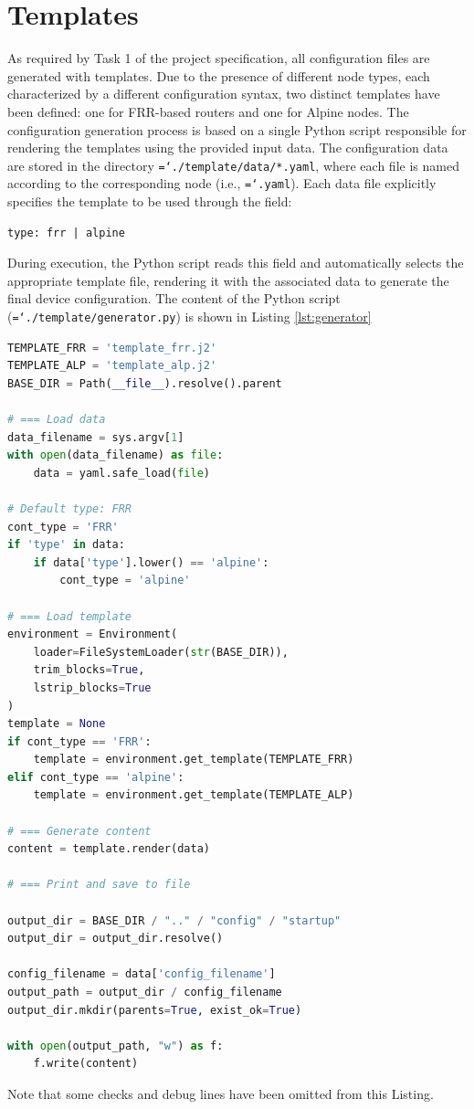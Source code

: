 \documentclass{report}
\newcommand{\monospaced}[1]{\texttt{\hyphenchar\font=`\-#1}}
\begin{document}
\section{Templates}
As required by Task 1 of the project specification, all configuration files are generated with templates. Due to the presence of different node types, each characterized by a different configuration syntax, two distinct templates have been defined: one for FRR-based routers and one for Alpine nodes.\newline
The configuration generation process is based on a single Python script responsible for rendering the templates using the provided input data. The configuration data are stored in the directory \monospaced{./template/data/*.yaml}, where each file is named according to the corresponding node (i.e., \monospaced{<node-name>.yaml}).
Each data file explicitly specifies the template to be used through the field:
\begin{lstlisting}[style=styleYml]
type: frr | alpine
\end{lstlisting}
During execution, the Python script reads this field and automatically selects the appropriate template file, rendering it with the associated data to generate the final device configuration. The content of the Python script (\monospaced{./template/generator.py}) is shown in Listing \ref{lst:generator}

\begin{lstlisting}[language=Python, style=stylePython, caption=Template processing, label=lst:generator]      
TEMPLATE_FRR = 'template_frr.j2'
TEMPLATE_ALP = 'template_alp.j2'
BASE_DIR = Path(__file__).resolve().parent

# === Load data
data_filename = sys.argv[1]
with open(data_filename) as file:
    data = yaml.safe_load(file)

# Default type: FRR
cont_type = 'FRR' 
if 'type' in data:
    if data['type'].lower() == 'alpine':
        cont_type = 'alpine'

# === Load template
environment = Environment(
    loader=FileSystemLoader(str(BASE_DIR)),
    trim_blocks=True,
    lstrip_blocks=True
)
template = None
if cont_type == 'FRR':
    template = environment.get_template(TEMPLATE_FRR)
elif cont_type == 'alpine':
    template = environment.get_template(TEMPLATE_ALP)
    
# === Generate content
content = template.render(data)

# === Print and save to file

output_dir = BASE_DIR / ".." / "config" / "startup"
output_dir = output_dir.resolve()

config_filename = data['config_filename']
output_path = output_dir / config_filename
output_dir.mkdir(parents=True, exist_ok=True)

with open(output_path, "w") as f:
    f.write(content)
\end{lstlisting}
Note that some checks and debug lines have been omitted from this Listing. 
\end{document}
